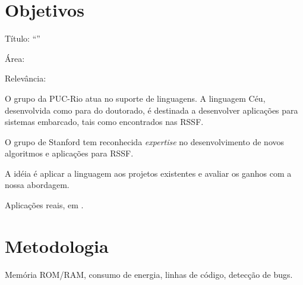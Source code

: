 \documentclass[11pt,a4paper]{report}
\begin{document}
\chapter{Objetivos}

Título: ``''

Área:

Relevância:

O grupo da PUC-Rio atua no suporte de linguagens.
A linguagem Céu, desenvolvida como para do doutorado, é destinada a desenvolver 
aplicações para sistemas embarcado, tais como encontrados nas RSSF.

O grupo de Stanford tem reconhecida \emph{expertise} no desenvolvimento de 
novos algoritmos e aplicações para RSSF.

A idéia é aplicar a linguagem aos projetos existentes e avaliar os ganhos com a 
nossa abordagem.

Aplicações reais, em .

\chapter{Metodologia}

Memória ROM/RAM, consumo de energia, linhas de código, detecção de bugs.



\end{document}

